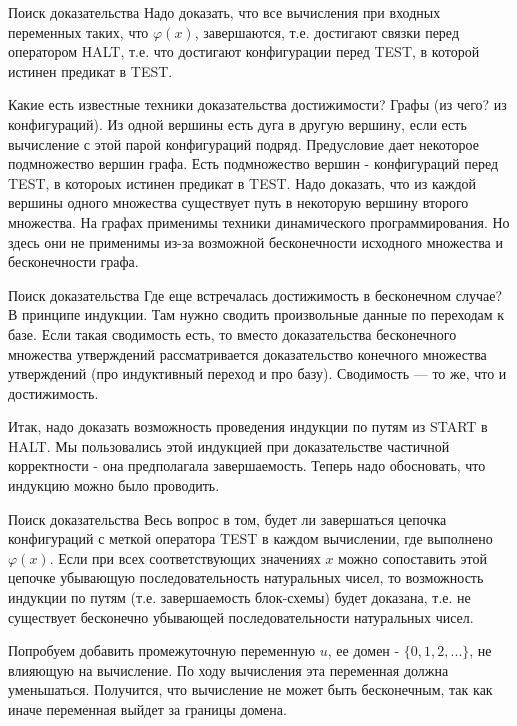 \documentclass[hyperref={unicode=true}]{beamer}
\begin{document}
    \begin{frame}{Поиск доказательства}
    Надо доказать, что все вычисления при входных переменных таких, что $\varphi(x)$, завершаются, т.е. достигают связки перед оператором HALT, т.е. что достигают конфигурации перед TEST, в которой истинен предикат в TEST.

    Какие есть известные техники доказательства достижимости? Графы (из чего? из конфигураций). Из одной вершины есть дуга в другую вершину, если есть вычисление с этой парой конфигураций подряд. Предусловие дает некоторое подмножество вершин графа. Есть подмножество вершин - конфигураций перед TEST, в котороых истинен предикат в TEST. Надо доказать, что из каждой вершины одного множества существует путь в некоторую вершину второго множества. На графах применимы техники динамического программирования. Но здесь они не применимы из-за возможной бесконечности исходного множества и бесконечности графа.
    \end{frame}

    \begin{frame}{Поиск доказательства}
    Где еще встречалась достижимость в бесконечном случае? В принципе индукции. Там нужно сводить произвольные данные по переходам к базе. Если такая сводимость есть, то вместо доказательства бесконечного множества утверждений рассматривается доказательство конечного множества утверждений (про индуктивный переход и про базу). Сводимость --- то же, что и достижимость.

    Итак, надо доказать возможность проведения индукции по путям из START в HALT. Мы пользовались этой индукцией при доказательстве частичной корректности - она предполагала завершаемость. Теперь надо обосновать, что индукцию можно было проводить.
    \end{frame}

    \begin{frame}{Поиск доказательства}
    Весь вопрос в том, будет ли завершаться цепочка конфигураций с меткой оператора TEST в каждом вычислении, где выполнено $\varphi(x)$. Если при всех соответствующих значениях $x$ можно сопоставить этой цепочке убывающую последовательность натуральных чисел, то возможность индукции по путям (т.е. завершаемость блок-схемы) будет доказана, т.е. не существует бесконечно убывающей последовательности натуральных чисел.

    Попробуем добавить промежуточную переменную $u$, ее домен - $\{0,1,2,...\}$, не влияющую на вычисление. По ходу вычисления эта переменная должна уменьшаться. Получится, что вычисление не может быть бесконечным, так как иначе переменная выйдет за границы домена.
    \end{frame}
\end{document}
